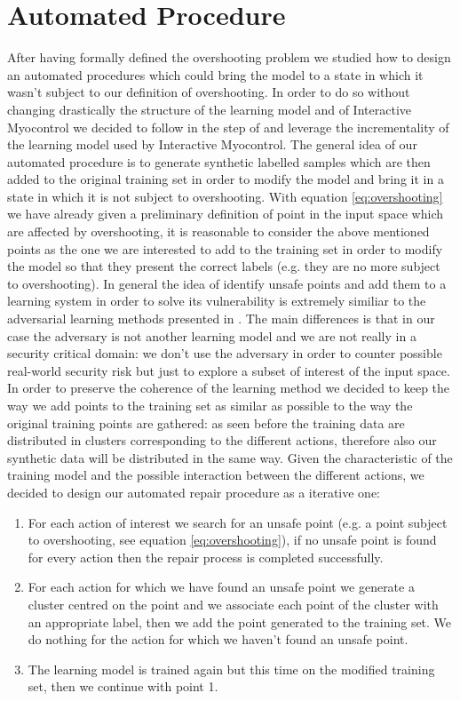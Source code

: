 \section{Automated Procedure}
After having formally defined the overshooting problem we studied how to design an automated procedures which could bring the model to a state in which it wasn't subject to our definition of overshooting. In order to do so without changing drastically the structure of the learning model and of Interactive Myocontrol we decided to follow in the step of \cite{Strazzulla2017} and leverage the incrementality of the learning model used by Interactive Myocontrol.
The general idea of our automated procedure is to generate synthetic labelled samples which are then added to the original training set in order to modify the model and bring it in a state in which it is not subject to overshooting. With equation \ref{eq:overshooting} we have already given a preliminary definition of point in the input space which are affected by overshooting, it is reasonable to consider the above mentioned points as the one we are interested to add to the training set in order to modify the model so that they present the correct labels (e.g. they are no more subject to overshooting).
In general the idea of identify unsafe points and add them to a learning system in order to solve its vulnerability is extremely similiar to the adversarial learning methods presented in \cite{goodfellow2014generative}. The main differences is that in our case the adversary is not another learning model and we are not really in a security critical domain: we don't use the adversary in order to counter possible real-world security risk but just to explore a subset of interest of the input space.  
In order to preserve the coherence of the learning method we decided to keep the way we add points to the training set as similar as possible to the way the original training points are gathered: as seen before the training data are distributed in clusters corresponding to the different actions, therefore also our synthetic data will be distributed in the same way.
Given the characteristic of the training model and the possible interaction between the different actions, we decided to design our automated repair procedure as a iterative one:
\begin{enumerate}
    \item For each action of interest we search for an unsafe point (e.g. a point subject to overshooting, see equation \ref{eq:overshooting}), if no unsafe point is found for every action then the repair process is completed successfully.
    \item For each action for which we have found an unsafe point we generate a cluster centred on the point and we associate each point of the cluster with an appropriate label, then we add the point generated to the training set. We do nothing for the action for which we haven't found an unsafe point.
    \item The learning model is trained again but this time on the modified training set, then we continue with point 1.
\end{enumerate}
